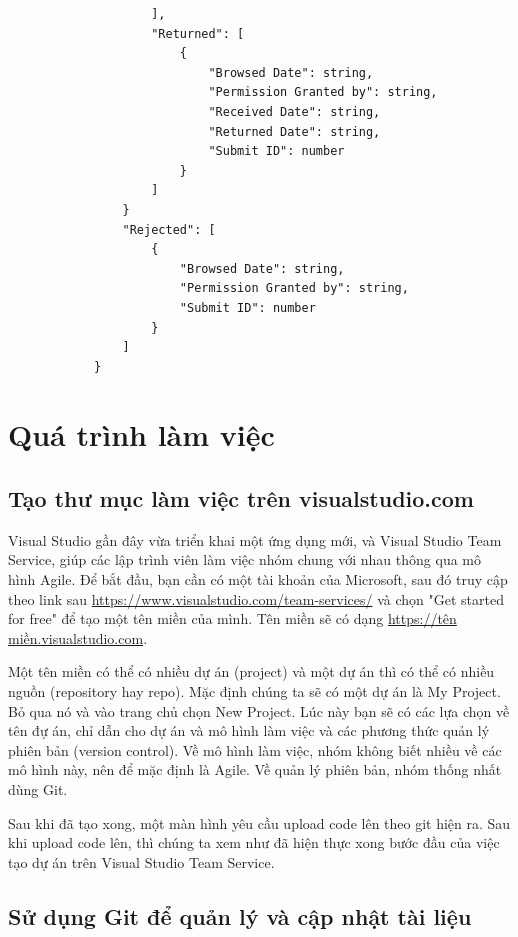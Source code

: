 \documentclass[12pt,a4paper]{report}
\begin{document}
\begin{enumerate}
\begin{verbatim}
                    ],
                    "Returned": [
                        {
                            "Browsed Date": string,
                            "Permission Granted by": string,
                            "Received Date": string,
                            "Returned Date": string,
                            "Submit ID": number
                        }
                    ]
                }
                "Rejected": [
                    {
                        "Browsed Date": string,
                        "Permission Granted by": string,
                        "Submit ID": number
                    }
                ]
            }
            \end{verbatim}
            \end{enumerate}
    \newpage
    \section{Quá trình làm việc}
        \subsection{Tạo thư mục làm việc trên visualstudio.com}

        Visual Studio gần đây vừa triển khai một ứng dụng mới, và Visual Studio Team Service, giúp các lập trình viên làm việc nhóm chung với nhau thông qua mô hình Agile. Để bắt đầu, bạn cần có một tài khoản của Microsoft, sau đó truy cập theo link sau \url{https://www.visualstudio.com/team-services/} và chọn "Get started for free" để tạo một tên miền của mình. Tên miền sẽ có dạng \url{https://tên miền.visualstudio.com}.\par
        Một tên miền có thể có nhiều dự án (project) và một dự án thì có thể có nhiều nguồn (repository hay repo). Mặc định chúng ta sẽ có một dự án là My Project. Bỏ qua nó và vào trang chủ chọn New Project. Lúc này bạn sẽ có các lựa chọn về tên đự án, chỉ dẫn cho dự án và mô hình làm việc và các phương thức quản lý phiên bản (version control). Về mô hình làm việc, nhóm không biết nhiều về các mô hình này, nên để mặc định là Agile. Về quản lý phiên bản, nhóm thống nhất dùng Git.\par
        Sau khi đã tạo xong, một màn hình yêu cầu upload code lên theo git hiện ra. Sau khi upload code lên, thì chúng ta xem như đã hiện thực xong bước đầu của việc tạo dự án trên Visual Studio Team Service.

        \subsection{Sử dụng Git để quản lý và cập nhật tài liệu}
\end{document}
